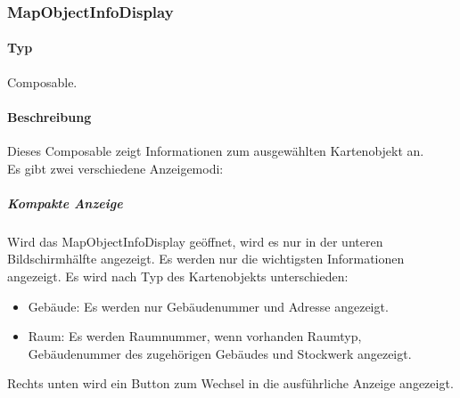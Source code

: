 \subsubsection{MapObjectInfoDisplay}
\paragraph*{Typ}
Composable.
\paragraph*{Beschreibung}
Dieses Composable zeigt Informationen zum ausgewählten Kartenobjekt an.\\
Es gibt zwei verschiedene Anzeigemodi:

\subparagraph*{Kompakte Anzeige}
Wird das MapObjectInfoDisplay geöffnet, wird es nur in der unteren Bildschirmhälfte angezeigt. 
Es werden nur die wichtigsten Informationen angezeigt. Es wird nach Typ des Kartenobjekts unterschieden:
\begin{itemize}
    \item Gebäude: Es werden nur Gebäudenummer und Adresse angezeigt.
    \item Raum: Es werden Raumnummer, wenn vorhanden Raumtyp, Gebäudenummer des zugehörigen Gebäudes und Stockwerk angezeigt.
\end{itemize}
Rechts unten wird ein Button zum Wechsel in die ausführliche Anzeige angezeigt.

